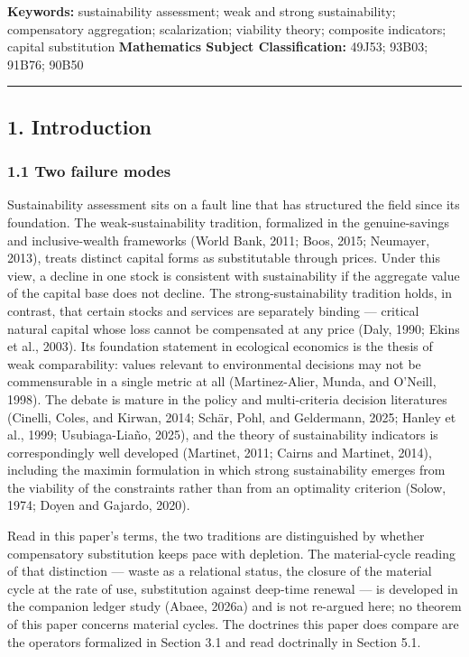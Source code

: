 \documentclass[11pt]{article}
\begin{document}
\textbf{Keywords:} sustainability assessment; weak and strong
sustainability; compensatory aggregation; scalarization; viability
theory; composite indicators; capital substitution \textbf{Mathematics
Subject Classification:} 49J53; 93B03; 91B76; 90B50

\begin{center}\rule{0.5\linewidth}{0.5pt}\end{center}

\subsection{1. Introduction}\label{introduction}

\subsubsection{1.1 Two failure modes}\label{two-failure-modes}

Sustainability assessment sits on a fault line that has structured the
field since its foundation. The weak-sustainability tradition,
formalized in the genuine-savings and inclusive-wealth frameworks (World
Bank, 2011; Boos, 2015; Neumayer, 2013), treats distinct capital forms
as substitutable through prices. Under this view, a decline in one stock
is consistent with sustainability if the aggregate value of the capital
base does not decline. The strong-sustainability tradition holds, in
contrast, that certain stocks and services are separately binding ---
critical natural capital whose loss cannot be compensated at any price
(Daly, 1990; Ekins et al., 2003). Its foundation statement in ecological
economics is the thesis of weak comparability: values relevant to
environmental decisions may not be commensurable in a single metric at
all (Martinez-Alier, Munda, and O'Neill, 1998). The debate is mature in
the policy and multi-criteria decision literatures (Cinelli, Coles, and
Kirwan, 2014; Sch\"ar, Pohl, and Geldermann, 2025; Hanley et al., 1999;
Usubiaga-Lia\~no, 2025), and the theory of sustainability indicators is
correspondingly well developed (Martinet, 2011; Cairns and Martinet,
2014), including the maximin formulation in which strong sustainability
emerges from the viability of the constraints rather than from an
optimality criterion (Solow, 1974; Doyen and Gajardo, 2020).

Read in this paper's terms, the two traditions are distinguished by
whether compensatory substitution keeps pace with depletion. The
material-cycle reading of that distinction --- waste as a relational
status, the closure of the material cycle at the rate of use,
substitution against deep-time renewal --- is developed in the companion ledger study (Abaee, 2026a) and is not re-argued here; no theorem of this paper concerns material cycles. The
doctrines this paper does compare are the operators formalized in
Section 3.1 and read doctrinally in Section 5.1.
\end{document}
